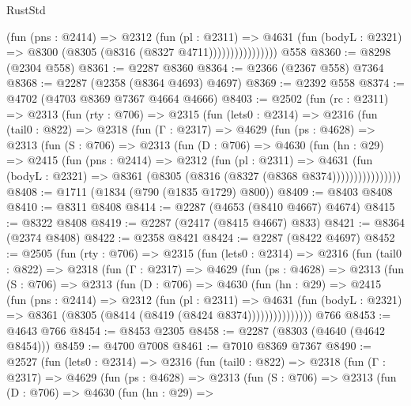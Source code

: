 \begin{lexlean}{RustStd}
\begin{coremodule}
                        (fun (pns : @2414) =>
                        @2312
                          (fun (pl : @2311) =>
                          @4631
                            (fun (bodyL : @2321) => @8300 (@8305 (@8316 (@8327 @4711))))))))))))))))
    @558
@8360 := @8298 (@2304 @558)
@8361 := @2287 @8360
@8364 := @2366 (@2367 @558) @7364
@8368 := @2287 (@2358 (@8364 @4693) @4697)
@8369 := @2392 @558
@8374 := @4702 (@4703 @8369 @7367 @4664 @4666)
@8403 := @2502
    (fun (rc : @2311) =>
    @2313
      (fun (rty : @706) =>
      @2315
        (fun (lets0 : @2314) =>
        @2316
          (fun (tail0 : @822) =>
          @2318
            (fun (Γ : @2317) =>
            @4629
              (fun (ps : @4628) =>
              @2313
                (fun (S : @706) =>
                @2313
                  (fun (D : @706) =>
                  @4630
                    (fun (hn : @29) =>
                    @2415
                      (fun (pns : @2414) =>
                      @2312
                        (fun (pl : @2311) =>
                        @4631
                          (fun (bodyL : @2321) =>
                          @8361 (@8305 (@8316 (@8327 (@8368 @8374))))))))))))))))
@8408 := @1711 (@1834 (@790 (@1835 @1729) @800))
@8409 := @8403 @8408
@8410 := @8311 @8408
@8414 := @2287 (@4653 (@8410 @4667) @4674)
@8415 := @8322 @8408
@8419 := @2287 (@2417 (@8415 @4667) @833)
@8421 := @8364 (@2374 @8408)
@8422 := @2358 @8421
@8424 := @2287 (@8422 @4697)
@8452 := @2505
    (fun (rty : @706) =>
    @2315
      (fun (lets0 : @2314) =>
      @2316
        (fun (tail0 : @822) =>
        @2318
          (fun (Γ : @2317) =>
          @4629
            (fun (ps : @4628) =>
            @2313
              (fun (S : @706) =>
              @2313
                (fun (D : @706) =>
                @4630
                  (fun (hn : @29) =>
                  @2415
                    (fun (pns : @2414) =>
                    @2312
                      (fun (pl : @2311) =>
                      @4631
                        (fun (bodyL : @2321) =>
                        @8361 (@8305 (@8414 (@8419 (@8424 @8374)))))))))))))))
    @766
@8453 := @4643 @766
@8454 := @8453 @2305
@8458 := @2287 (@8303 (@4640 (@4642 @8454)))
@8459 := @4700 @7008
@8461 := @7010 @8369 @7367
@8490 := @2527
    (fun (lets0 : @2314) =>
    @2316
      (fun (tail0 : @822) =>
      @2318
        (fun (Γ : @2317) =>
        @4629
          (fun (ps : @4628) =>
          @2313
            (fun (S : @706) =>
            @2313
              (fun (D : @706) =>
              @4630
                (fun (hn : @29) =>

\end{coremodule}
\end{lexlean}
